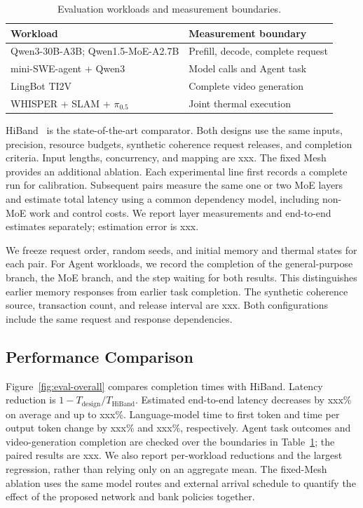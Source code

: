 \documentclass[conference,10pt]{IEEEtran}
\begin{document}
\begin{table}[!t]
\caption{Evaluation workloads and measurement boundaries.}
\label{tab:eval-workloads}
\centering\footnotesize
\begin{tabularx}{\columnwidth}{@{}>{\raggedright\arraybackslash}p{}>{\raggedright\arraybackslash}X@{}}
\hline
Workload & Measurement boundary \\
\hline
Qwen3-30B-A3B; Qwen1.5-MoE-A2.7B & Prefill, decode, complete request \\
mini-SWE-agent + Qwen3 & Model calls and Agent task \\
LingBot TI2V & Complete video generation \\
WHISPER + SLAM + $\pi_{0.5}$ & Joint thermal execution \\
\hline
\end{tabularx}
\end{table}

HiBand~\cite{wang2026hiband} is the state-of-the-art comparator.
Both designs use the same inputs, precision, resource budgets, synthetic
coherence request releases, and completion criteria. Input lengths,
concurrency, and mapping are xxx. The fixed Mesh provides an additional
ablation. Each experimental line first records a complete run for calibration.
Subsequent pairs measure the same one or two MoE layers and estimate total
latency using a common dependency model, including non-MoE work and
control costs. We report layer measurements and end-to-end estimates
separately; estimation error is xxx.

We freeze request order, random seeds, and initial memory and thermal
states for each pair. For Agent workloads, we record the completion
of the general-purpose branch, the MoE branch, and the step waiting
for both results. This distinguishes earlier memory responses from
earlier task completion. The synthetic coherence source, transaction
count, and release interval are xxx. Both configurations include the
same request and response dependencies.

\subsection{Performance Comparison}
Figure~\ref{fig:eval-overall} compares completion times with HiBand.
Latency reduction is $1-T_{\mathrm{design}}/T_{\mathrm{HiBand}}$.
Estimated end-to-end latency decreases by xxx\% on average and up to
xxx\%. Language-model time to first token and time per output token
change by xxx\% and xxx\%, respectively. Agent task outcomes and
video-generation completion are checked over the boundaries in
Table~\ref{tab:eval-workloads}; the paired results are xxx.
We also report per-workload reductions and the largest regression,
rather than relying only on an aggregate mean. The fixed-Mesh ablation
uses the same model routes and external arrival schedule to quantify
the effect of the proposed network and bank policies together.
\end{document}
